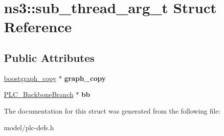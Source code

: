 \hypertarget{structns3_1_1sub__thread__arg__t}{\section{ns3\-:\-:sub\-\_\-thread\-\_\-arg\-\_\-t \-Struct \-Reference}
\label{structns3_1_1sub__thread__arg__t}
}
\subsection*{\-Public \-Attributes}
\begin{DoxyCompactItemize}
\item 
\hypertarget{structns3_1_1sub__thread__arg__t_a1767834eae4930097df5a3866f7b75df}{\hyperlink{structns3_1_1boostgraph__copy__t}{boostgraph\-\_\-copy} $\ast$ {\bfseries graph\-\_\-copy}}\label{structns3_1_1sub__thread__arg__t_a1767834eae4930097df5a3866f7b75df}

\item 
\hypertarget{structns3_1_1sub__thread__arg__t_af5c285efd455ae2b145b6e1b2d01ae42}{\hyperlink{classns3_1_1PLC__BackboneBranch}{\-P\-L\-C\-\_\-\-Backbone\-Branch} $\ast$ {\bfseries bb}}\label{structns3_1_1sub__thread__arg__t_af5c285efd455ae2b145b6e1b2d01ae42}

\end{DoxyCompactItemize}


\-The documentation for this struct was generated from the following file\-:\begin{DoxyCompactItemize}
\item 
model/plc-\/defs.\-h\end{DoxyCompactItemize}
